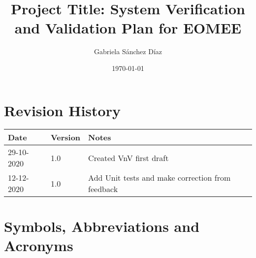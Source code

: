 \documentclass[12pt, titlepage]{article}
\begin{document}
\title{Project Title: System Verification and Validation Plan for EOMEE} 
\author{Gabriela S\'anchez D\'iaz}
\date{\today}
	
\maketitle


\section{Revision History}

\begin{tabularx}{\textwidth}{p{3cm}p{2cm}X}
\toprule {\bf Date} & {\bf Version} & {\bf Notes}\\
\midrule
29-10-2020 & 1.0 & Created VnV first draft \\
12-12-2020 & 1.0 & Add Unit tests and make correction from feedback \\
\bottomrule
\end{tabularx}

\newpage

\tableofcontents

\listoftables


\newpage

\section{Symbols, Abbreviations and Acronyms}
\end{document}
